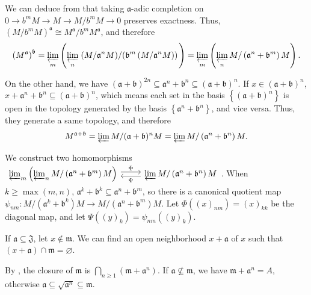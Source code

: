 \begin{exercise}\label{ex10.5}
	We can deduce from  that taking $\mathfrak{a}$-adic completion on $0\rightarrow b^mM\rightarrow M\rightarrow M/b^mM\rightarrow0$ preserves exactness. Thus, $\left(M/b^mM\right)^\mathfrak{a}\cong M^\mathfrak{a}/b^mM^\mathfrak{a}$, and therefore
	\begin{equation*}
		\left(M^\mathfrak{a}\right)^\mathfrak{b}
		=\varprojlim_m\left(\varprojlim_n\left.\left(M/\mathfrak{a}^nM\right)\middle/\left(\mathfrak{b}^m\left(M/\mathfrak{a}^nM\right)\right)\right.\right)
		=\varprojlim_m\left(\varprojlim_nM/\left(\mathfrak{a}^n+\mathfrak{b}^m\right)M\right).
	\end{equation*}
	
	On the other hand, we have $(\mathfrak{a}+\mathfrak{b})^{2n}\subseteq\mathfrak{a}^n+\mathfrak{b}^n\subseteq(\mathfrak{a}+\mathfrak{b})^{n}$. If $x\in(\mathfrak{a}+\mathfrak{b})^{n}$, $x+\mathfrak{a}^n+\mathfrak{b}^n\subseteq(\mathfrak{a}+\mathfrak{b})^{n}$, which means each set in the basis $\left\{(\mathfrak{a}+\mathfrak{b})^{n}\right\}$ is open in the topology generated by the basis $\left\{\mathfrak{a}^n+\mathfrak{b}^n\right\}$, and vice versa. Thus, they generate a same topology, and therefore
	\begin{equation*}
		M^{\mathfrak{a}+\mathfrak{b}}=\varprojlim M/(\mathfrak{a}+\mathfrak{b})^nM=\varprojlim M/\left(\mathfrak{a}^n+\mathfrak{b}^n\right)M.
	\end{equation*}
	
	We construct two homomorphisms $\begin{tikzcd}
		\varprojlim_m\left(\varprojlim_nM/\left(\mathfrak{a}^n+\mathfrak{b}^m\right)M\right)\arrow[r, shift left, "\Phi"]&
		\varprojlim M/\left(\mathfrak{a}^n+\mathfrak{b}^n\right)M\arrow[l, shift left, "\Psi"]
	\end{tikzcd}$. When $k\geqslant\max(m,n)$, $\mathfrak{a}^k+\mathfrak{b}^k\subseteq\mathfrak{a}^n+\mathfrak{b}^m$, so there is a canonical quotient map $\psi_{nm}:M/\left(\mathfrak{a}^k+\mathfrak{b}^k\right)M\rightarrow M/\left(\mathfrak{a}^n+\mathfrak{b}^m\right)M$. Let $\Phi\left((x)_{nm}\right)=(x)_{kk}$ be the diagonal map, and let $\Psi\left((y)_k\right)=\psi_{nm}\left((y)_k\right)$.

\end{exercise}

\begin{exercise}\label{ex10.6}
	If $\mathfrak{a}\subseteq\mathfrak{J}$, let $x\notin\mathfrak{m}$. We can find an open neighborhood $x+\mathfrak{a}$ of $x$ such that $(x+\mathfrak{a})\cap\mathfrak{m}=\varnothing$.
	
	By , the closure of $\mathfrak{m}$ is $\bigcap_{n\geqslant1}\left(\mathfrak{m}+\mathfrak{a}^n\right)$. If $\mathfrak{a}\nsubseteq\mathfrak{m}$, we have $\mathfrak{m}+\mathfrak{a}^n=A$, otherwise $\mathfrak{a}\subseteq\sqrt{\mathfrak{a}^n}\subseteq\mathfrak{m}$.
\end{exercise}

